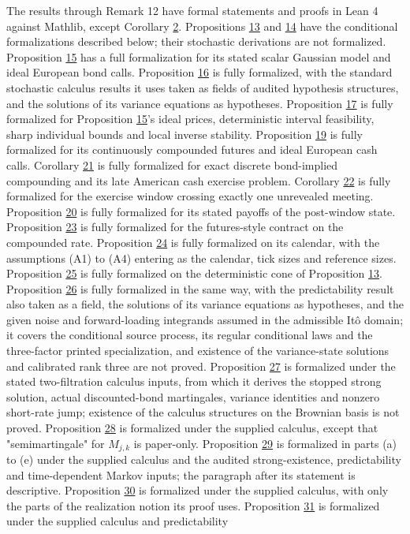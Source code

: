 \documentclass[11pt]{article}
\begin{document}
The results through Remark 12 have formal statements and proofs in Lean 4 against Mathlib, except Corollary \hyperref[res:Corollary-2]{2}. Propositions \hyperref[res:Proposition-13]{13} and \hyperref[res:Proposition-14]{14} have the conditional formalizations described below; their stochastic derivations are not formalized. Proposition \hyperref[res:Proposition-15]{15} has a full formalization for its stated scalar Gaussian model and ideal European bond calls. Proposition \hyperref[res:Proposition-16]{16} is fully formalized, with the standard stochastic calculus results it uses taken as fields of audited hypothesis structures, and the solutions of its variance equations as hypotheses. Proposition \hyperref[res:Proposition-17]{17} is fully formalized for Proposition \hyperref[res:Proposition-15]{15}'s ideal prices, deterministic interval feasibility, sharp individual bounds and local inverse stability. Proposition \hyperref[res:Proposition-19]{19} is fully formalized for its continuously compounded futures and ideal European cash calls. Corollary \hyperref[res:Corollary-21]{21} is fully formalized for exact discrete bond-implied compounding and its late American cash exercise problem. Corollary \hyperref[res:Corollary-22]{22} is fully formalized for the exercise window crossing exactly one unrevealed meeting. Proposition \hyperref[res:Proposition-20]{20} is fully formalized for its stated payoffs of the post-window state. Proposition \hyperref[res:Proposition-23]{23} is fully formalized for the futures-style contract on the compounded rate. Proposition \hyperref[res:Proposition-24]{24} is fully formalized on its calendar, with the assumptions (A1) to (A4) entering as the calendar, tick sizes and reference sizes. Proposition \hyperref[res:Proposition-25]{25} is fully formalized on the deterministic cone of Proposition \hyperref[res:Proposition-13]{13}. Proposition \hyperref[res:Proposition-26]{26} is fully formalized in the same way, with the predictability result also taken as a field, the solutions of its variance equations as hypotheses, and the given noise and forward-loading integrands assumed in the admissible Itô domain; it covers the conditional source process, its regular conditional laws and the three-factor printed specialization, and existence of the variance-state solutions and calibrated rank three are not proved. Proposition \hyperref[res:Proposition-27]{27} is formalized under the stated two-filtration calculus inputs, from which it derives the stopped strong solution, actual discounted-bond martingales, variance identities and nonzero short-rate jump; existence of the calculus structures on the Brownian basis is not proved. Proposition \hyperref[res:Proposition-28]{28} is formalized under the supplied calculus, except that "semimartingale" for \(M_{j,k}\) is paper-only. Proposition \hyperref[res:Proposition-29]{29} is formalized in parts (a) to (e) under the supplied calculus and the audited strong-existence, predictability and time-dependent Markov inputs; the paragraph after its statement is descriptive. Proposition \hyperref[res:Proposition-30]{30} is formalized under the supplied calculus, with only the parts of the realization notion its proof uses. Proposition \hyperref[res:Proposition-31]{31} is formalized under the supplied calculus and predictability 
\end{document}
